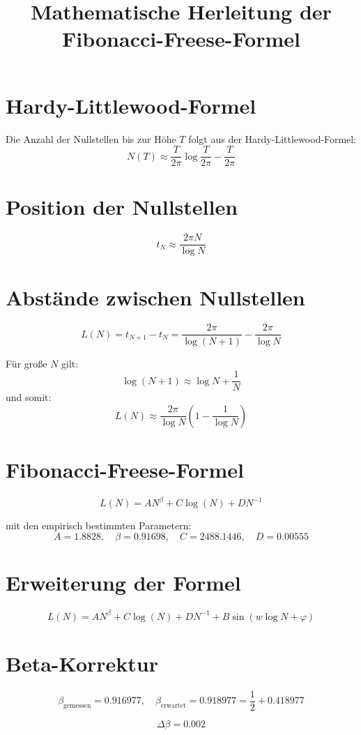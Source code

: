 \documentclass[a4paper,12pt]{article}
\begin{document}
\title{Mathematische Herleitung der Fibonacci-Freese-Formel}
\author{}
\date{}
\maketitle

\section{Hardy-Littlewood-Formel}
Die Anzahl der Nullstellen bis zur Höhe $T$ folgt aus der Hardy-Littlewood-Formel:
\[
N(T) \approx \frac{T}{2\pi} \log \frac{T}{2\pi} - \frac{T}{2\pi}
\]

\section{Position der Nullstellen}
\[
t_N \approx \frac{2\pi N}{\log N}
\]

\section{Abstände zwischen Nullstellen}
\[
L(N) = t_{N+1} - t_N = \frac{2\pi}{\log(N+1)} - \frac{2\pi}{\log N}
\]

Für große $N$ gilt:
\[
\log(N+1) \approx \log N + \frac{1}{N}
\]
und somit:
\[
L(N) \approx \frac{2\pi}{\log N} \left( 1 - \frac{1}{\log N} \right)
\]

\section{Fibonacci-Freese-Formel}
\[
L(N) = A N^\beta + C \log(N) + D N^{-1}
\]

mit den empirisch bestimmten Parametern:
\[
A = 1.8828, \quad \beta = 0.91698, \quad C = 2488.1446, \quad D = 0.00555
\]

\section{Erweiterung der Formel}
\[
L(N) = A N^\beta + C \log(N) + D N^{-1} + B \sin(w \log N + \varphi)
\]

\section{Beta-Korrektur}
\[
\beta_{\text{gemessen}} = 0.916977, \quad \beta_{\text{erwartet}} = 0.918977 = \frac{1}{2} + 0.418977
\]

\[
\Delta \beta = 0.002
\]
\end{document}

